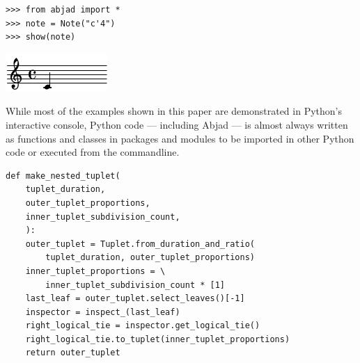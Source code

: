 \documentclass{article}
\begin{document}

\begin{lstlisting}
>>> from abjad import *
>>> note = Note("c'4")
>>> show(note)
\end{lstlisting}
\includegraphics{assets/lilypond-c018a545d264ff34225e9a3a5babb6c1.pdf}

While most of the examples shown in this paper are demonstrated in Python's
interactive console, Python code --- including Abjad --- is almost always
written as functions and classes in packages and modules to be imported in
other Python code or executed from the commandline.

\begin{lstlisting}
def make_nested_tuplet(
    tuplet_duration,
    outer_tuplet_proportions,
    inner_tuplet_subdivision_count,
    ):
    outer_tuplet = Tuplet.from_duration_and_ratio(
        tuplet_duration, outer_tuplet_proportions)
    inner_tuplet_proportions = \
        inner_tuplet_subdivision_count * [1]
    last_leaf = outer_tuplet.select_leaves()[-1]
    inspector = inspect_(last_leaf)
    right_logical_tie = inspector.get_logical_tie()
    right_logical_tie.to_tuplet(inner_tuplet_proportions)
    return outer_tuplet
\end{lstlisting}

\end{document}
